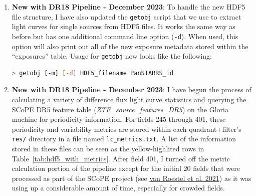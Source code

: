 \documentclass[12pt]{article}
\begin{document}
\begin{enumerate}
    All exposure metadata is now being saved into a file called {\tt epochs.txt} found within the {\tt res/} directory of each quadrant, which is what gets loaded to populate the HDF5 file's ``exposures'' table, so these queries won't need to be re-run during subsequent iterations of the pipeline. One caveat to this, however, is that the {\sc infobits} values associated with each image are occasionally updated, meaning an image could go from being considered good quality to having a potential flaw. Re-running these queries would ensure the most up-to-date information in that regard. Lastly, in the most recent pipeline iteration ({\bf DR18, December 2023}), I did not have the pipeline remove older photometry where the image {\sc infobits} changed from $0$ to $>0$, so the light curve database will have some data points associated with {\sc infobits}$\,{>}\,0$ images even though our image quality constraints require {\sc infobits}$\,{=}\,0$.

    \item {\bf New with DR18 Pipeline - December 2023}: To handle the new HDF5 file structure, I have also updated the {\tt getobj} script that we use to extract light curves for single sources from HDF5 files. It works the same way as before but has one additional command line option ({\tt -d}). When used, this option will also print out all of the new exposure metadata stored within the ``exposures'' table. Usage for {\tt getobj} now looks like the following:

\vspace{0.2cm}
\begin{lstlisting}[language=bash,linewidth=9.5cm,frame=single,xleftmargin=20pt]
 > getobj [-m] [-d] HDF5_filename PanSTARRS_id
\end{lstlisting}
    
    \newpage
    \item {\bf New with DR18 Pipeline - December 2023}: I have begun the process of calculating a variety of difference flux light curve statistics and querying the SCoPE DR5 feature table ({\em ZTF\_source\_features\_DR5}) on the Gloria machine for periodicity information. For fields 245 through 401, these periodicity and variability metrics are stored within each quadrant+filter's {\tt res/} directory in a file named {\tt lc\_metrics.txt}. A list of the information stored in these files can be seen as the yellow-highlited rows in Table~\ref{tab:hdf5_with_metrics}. After field 401, I turned off the metric calculation portion of the pipeline except for the initial 20 fields that were processed as part of the SCoPE project (see \href{https://ui.adsabs.harvard.edu/abs/2021AJ....161..267V/abstract}{van Roestel et al. 2021}) as it was using up a considerable amount of time, especially for crowded fields.
    

\end{enumerate}
\end{document}
